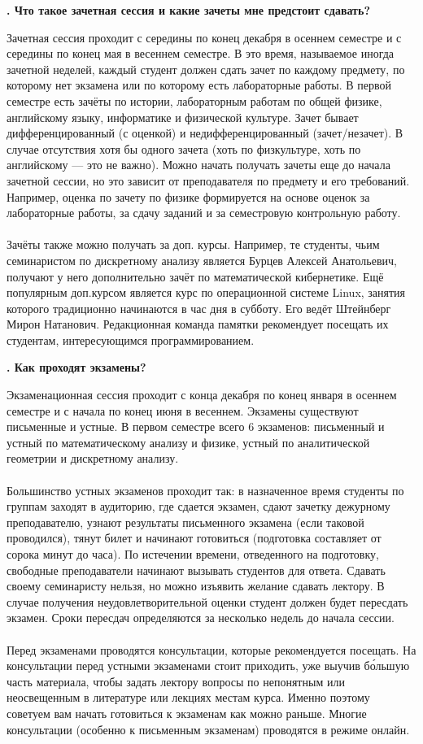 \documentclass[14pt]{extarticle}
\newcounter{question}
\newcommand\Que[1]{%
    \begin{minipage}{\textwidth}
    \leavevmode\par
    \stepcounter{question}
    \noindent
    {\large\textbf{\thequestion. #1}}\par}
\newcommand\Ans[2][]{%
    \leavevmode\par\noindent
    {\leftskip37pt
    \textbf{#1}#2\par}
    \end{minipage}}
\begin{document}
\Que{Что такое зачетная сессия и какие зачеты мне предстоит сдавать?}
\Ans{Зачетная сессия проходит с середины по конец декабря в осеннем семестре и с середины по конец мая в весеннем семестре. В это время, называемое иногда зачетной неделей, каждый студент должен сдать зачет по каждому предмету, по которому нет экзамена или по которому есть лабораторные работы. В первой семестре есть зачёты по истории, лабораторным работам по общей физике, английскому языку, информатике и физической культуре. Зачет бывает дифференцированный (с оценкой) и недифференцированный (зачет/незачет). В случае отсутствия хотя бы одного зачета (хоть по физкультуре, хоть по английскому — это не важно). Можно начать получать зачеты еще до начала зачетной сессии, но это зависит от преподавателя по предмету и его требований. Например, оценка по зачету по физике формируется на основе оценок за лабораторные работы, за сдачу заданий и за семестровую контрольную работу. \\ \\ Зачёты также можно получать за доп. курсы. Например, те студенты, чьим семинаристом по дискретному анализу является Бурцев Алексей Анатольевич, получают у него дополнительно зачёт по математической кибернетике. Ещё популярным доп.курсом является курс по операционной системе Linux, занятия которого традиционно начинаются в час дня в субботу. Его ведёт Штейнберг Мирон Натанович. Редакционная команда памятки рекомендует посещать их студентам, интересующимся программированием.}

\Que{Как проходят экзамены?}
\Ans{Экзаменационная сессия проходит с конца декабря по конец января в осеннем семестре и с начала по конец июня в весеннем. Экзамены существуют письменные и устные. В первом семестре всего 6 экзаменов: письменный и устный по математическому анализу и физике, устный по аналитической геометрии и дискретному анализу. \\ \\ Большинство устных экзаменов проходит так: в назначенное время студенты по группам заходят в аудиторию, где сдается экзамен, сдают зачетку дежурному преподавателю, узнают результаты письменного экзамена (если таковой проводился), тянут билет и начинают готовиться (подготовка составляет от сорока минут до часа). По истечении времени, отведенного на подготовку, свободные преподаватели начинают вызывать студентов для ответа. Сдавать своему семинаристу нельзя, но можно изъявить желание сдавать лектору. В случае получения неудовлетворительной оценки студент должен будет пересдать экзамен. Сроки пересдач определяются за несколько недель до начала сессии. \\ \\ Перед экзаменами проводятся консультации, которые рекомендуется посещать. На консультации перед устными экзаменами стоит приходить, уже выучив бо́льшую часть материала, чтобы задать лектору вопросы по непонятным или неосвещенным в литературе или лекциях местам курса. Именно поэтому советуем вам начать готовиться к экзаменам как можно раньше. Многие консультации (особенно к письменным экзаменам) проводятся в режиме онлайн.}
\end{document}
